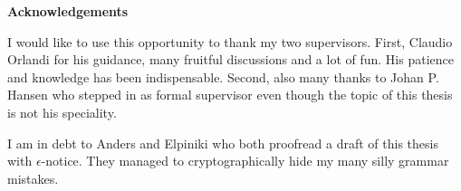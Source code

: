 \pagestyle{plain}
\begin{center}
  \large\textbf{Acknowledgements}
\end{center}

I would like to use this opportunity to thank my two supervisors. First, Claudio Orlandi for his guidance, many fruitful discussions and a lot of fun. His patience and knowledge has been indispensable. Second, also many thanks to Johan P. Hansen who stepped in as formal supervisor even though the topic of this thesis is not his speciality. 

I am in debt to Anders and Elpiniki who both proofread a draft of this thesis with $\epsilon$-notice. They managed to cryptographically hide my many silly grammar mistakes. 

\cleardoublepage